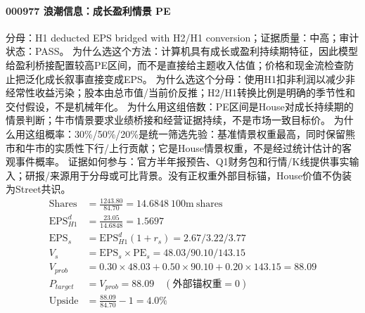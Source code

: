 \paragraph{000977 浪潮信息：成长盈利情景 PE}
分母：H1 deducted EPS bridged with H2/H1 conversion；证据质量：中高；审计状态：PASS。
为什么选这个方法：计算机具有成长或盈利持续期特征，因此模型给盈利桥接配置较高PE区间，而不是直接给主题收入估值；价格和现金流检查防止把泛化成长叙事直接变成EPS。
为什么选这个分母：使用H1扣非利润以减少非经常性收益污染；股本由总市值/当前价反推；H2/H1转换比例是明确的季节性和交付假设，不是机械年化。
为什么用这组倍数：PE区间是House对成长持续期的情景判断；牛市情景要求业绩桥接和经营证据持续，不是市场一致目标价。
为什么用这组概率：30\%/50\%/20\%是统一筛选先验：基准情景权重最高，同时保留熊市和牛市的实质性下行/上行贡献；它是House情景权重，不是经过统计估计的客观事件概率。
证据如何参与：官方半年报预告、Q1财务包和行情/K线提供事实输入；研报/来源用于分母或可比背景。没有正权重外部目标锚，House价值不伪装为Street共识。
\begin{align*}
\mathrm{Shares} &= \frac{1243.80}{84.70}=14.6848\ \mathrm{100m\ shares}\\
\mathrm{EPS}_{H1}^d &= \frac{23.05}{14.6848}=1.5697\\
\mathrm{EPS}_s &= \mathrm{EPS}_{H1}^d(1+r_s)=2.67/3.22/3.77\\
V_s &= \mathrm{EPS}_s\times \mathrm{PE}_s=48.03/90.10/143.15\\
V_{prob} &= 0.30\times 48.03+0.50\times 90.10+0.20\times 143.15=88.09\\
P_{target} &= V_{prob}=88.09\quad(\text{外部锚权重}=0)\\
\mathrm{Upside} &= \frac{88.09}{84.70}-1=4.0\%\\
\end{align*}

